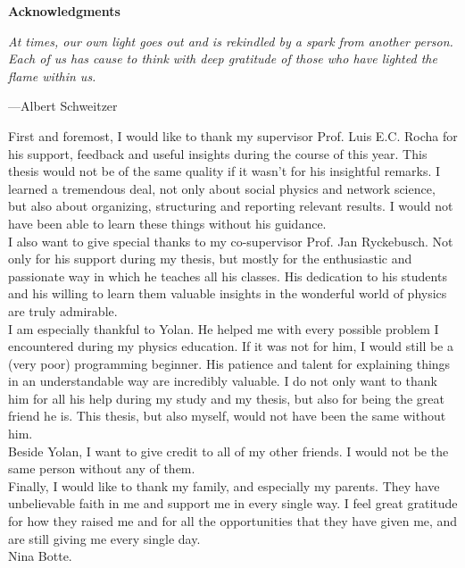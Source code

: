 \documentclass[11 pt , letterpaper , twoside , openright]{book}
\newenvironment{abstract}%
{\cleardoublepage\null \vfill\begin{center}\bfseries \abstractname \end{center}}{\vfill\null}
\begin{document}
\pagestyle{plain}

\setcounter{abstractpage}{\value{page}}

\renewcommand{\abstractname}{Acknowledgments}
\begin{abstract}
\thispagestyle{plain}
\setcounter{page}{\value{abstractpage}}

\epigraph{\itshape At times, our own light goes out and is rekindled by a spark from another person. Each of us has cause to think with deep gratitude of those who have lighted the flame within us.}{---Albert Schweitzer}
\vspace*{\fill}
\noindent
First and foremost, I would like to thank my supervisor Prof. Luis E.C. Rocha for his support, feedback and useful insights during the course of this year. This thesis would not be of the same quality if it wasn't for his insightful remarks. I learned a tremendous deal, not only about social physics and network science, but also about organizing, structuring and reporting relevant results. I would not have been able to learn these things without his guidance.\\
\newline
I also want to give special thanks to my co-supervisor Prof. Jan Ryckebusch. Not only for his support during my thesis, but mostly for the enthusiastic and passionate way in which he teaches all his classes. His dedication to his students and his willing to learn them valuable insights in the wonderful world of physics are truly admirable.\\
\newline
I am especially thankful to Yolan. He helped me with every possible problem I encountered during my physics education. If it was not for him, I would still be a (very poor) programming beginner. His patience and talent for explaining things in an understandable way are incredibly valuable. I do not only want to thank him for all his help during my study and my thesis, but also for being the great friend he is. This thesis, but also myself, would not have been the same without him.\\
\newline
Beside Yolan, I want to give credit to all of my other friends. I would not be the same person without any of them.\\
\newline
Finally, I would like to thank my family, and especially my parents. They have unbelievable faith in me and support me in every single way. I feel great gratitude for how they raised me and for all the opportunities that they have given me, and are still giving me every single day.\\
\vfill
\noindent
Nina Botte.

\setcounter{abstractpage}{\value{page}}

\end{abstract}
\setcounter{page}{\value{abstractpage}}
\end{document}
